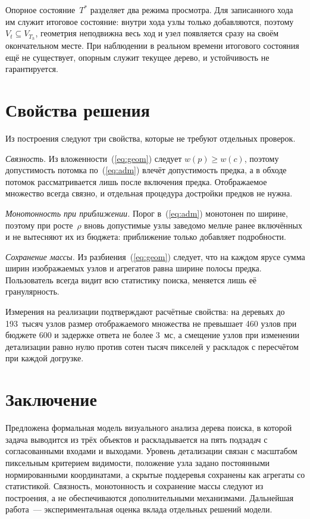\documentclass[12pt,a4paper]{article}
\begin{document}
Опорное состояние~$T^{*}$ разделяет два режима просмотра. Для записанного
хода им служит итоговое состояние: внутри хода узлы только добавляются,
поэтому $V_t \subseteq V_{T_h}$, геометрия неподвижна весь ход и узел
появляется сразу на своём окончательном месте. При наблюдении в реальном
времени итогового состояния ещё не существует, опорным служит текущее
дерево, и устойчивость не гарантируется.

\section{Свойства решения}

Из построения следуют три свойства, которые не требуют отдельных проверок.

\emph{Связность.} Из вложенности~(\ref{eq:geom}) следует $w(p) \ge w(c)$,
поэтому допустимость потомка по~(\ref{eq:adm}) влечёт допустимость предка, а
в обходе потомок рассматривается лишь после включения предка. Отображаемое
множество всегда связно, и отдельная процедура достройки предков не нужна.

\emph{Монотонность при приближении.} Порог в~(\ref{eq:adm}) монотонен по
ширине, поэтому при росте~$\rho$ вновь допустимые узлы заведомо мельче ранее
включённых и не вытесняют их из бюджета: приближение только добавляет
подробности.

\emph{Сохранение массы.} Из разбиения~(\ref{eq:geom}) следует, что на каждом
ярусе сумма ширин изображаемых узлов и агрегатов равна ширине полосы
предка. Пользователь всегда видит всю статистику поиска, меняется лишь её
гранулярность.

Измерения на реализации подтверждают расчётные свойства: на деревьях до
193~тысяч узлов размер отображаемого множества не превышает 460 узлов при
бюджете 600 и задержке ответа не более 3~мс, а смещение узлов при изменении
детализации равно нулю против сотен тысяч пикселей у раскладок с пересчётом
при каждой догрузке.

\section{Заключение}

Предложена формальная модель визуального анализа дерева поиска, в которой
задача выводится из трёх объектов и раскладывается на пять подзадач с
согласованными входами и выходами. Уровень детализации связан с масштабом
пиксельным критерием видимости, положение узла задано постоянными
нормированными координатами, а скрытые поддеревья сохранены как агрегаты со
статистикой. Связность, монотонность и сохранение массы следуют из
построения, а не обеспечиваются дополнительными механизмами. Дальнейшая
работа~--- экспериментальная оценка вклада отдельных решений модели.
\end{document}
